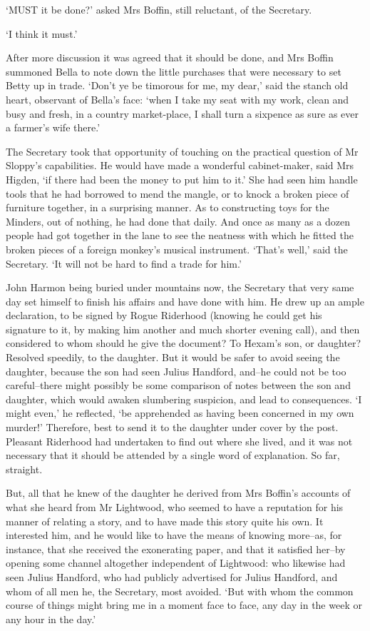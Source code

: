 ‘MUST it be done?’ asked Mrs Boffin, still reluctant, of the Secretary.

‘I think it must.’

After more discussion it was agreed that it should be done, and Mrs
Boffin summoned Bella to note down the little purchases that were
necessary to set Betty up in trade. ‘Don’t ye be timorous for me, my
dear,’ said the stanch old heart, observant of Bella’s face: ‘when I
take my seat with my work, clean and busy and fresh, in a country
market-place, I shall turn a sixpence as sure as ever a farmer’s wife
there.’

The Secretary took that opportunity of touching on the practical
question of Mr Sloppy’s capabilities. He would have made a wonderful
cabinet-maker, said Mrs Higden, ‘if there had been the money to put him
to it.’ She had seen him handle tools that he had borrowed to mend
the mangle, or to knock a broken piece of furniture together, in a
surprising manner. As to constructing toys for the Minders, out of
nothing, he had done that daily. And once as many as a dozen people had
got together in the lane to see the neatness with which he fitted the
broken pieces of a foreign monkey’s musical instrument. ‘That’s well,’
said the Secretary. ‘It will not be hard to find a trade for him.’

John Harmon being buried under mountains now, the Secretary that very
same day set himself to finish his affairs and have done with him. He
drew up an ample declaration, to be signed by Rogue Riderhood (knowing
he could get his signature to it, by making him another and much shorter
evening call), and then considered to whom should he give the document?
To Hexam’s son, or daughter? Resolved speedily, to the daughter. But it
would be safer to avoid seeing the daughter, because the son had seen
Julius Handford, and--he could not be too careful--there might possibly
be some comparison of notes between the son and daughter, which would
awaken slumbering suspicion, and lead to consequences. ‘I might even,’
he reflected, ‘be apprehended as having been concerned in my own
murder!’ Therefore, best to send it to the daughter under cover by the
post. Pleasant Riderhood had undertaken to find out where she lived,
and it was not necessary that it should be attended by a single word of
explanation. So far, straight.

But, all that he knew of the daughter he derived from Mrs Boffin’s
accounts of what she heard from Mr Lightwood, who seemed to have a
reputation for his manner of relating a story, and to have made this
story quite his own. It interested him, and he would like to have
the means of knowing more--as, for instance, that she received the
exonerating paper, and that it satisfied her--by opening some channel
altogether independent of Lightwood: who likewise had seen Julius
Handford, who had publicly advertised for Julius Handford, and whom
of all men he, the Secretary, most avoided. ‘But with whom the common
course of things might bring me in a moment face to face, any day in the
week or any hour in the day.’

